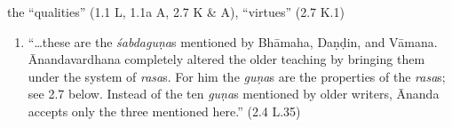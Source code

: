 \documentclass[10pt]{article}
\begin{document}
\begin{multicols}{2}
\begin{enumerate}[
			leftmargin=0em,
			rightmargin=0em,
		]



		 the ``qualities'' (1.1 L, 1.1a A, 2.7 K \& A), ``virtues'' (2.7 K.1)
		\begin{enumerate}
			 ``sweetness'' (2.7 K.1),

			 ``force'' (2.7 K.1),
			``strength'' (2.9 K)

			 ``clarity'' (2.7 K.1),
			``perspicuity'' [K. Kris.\ 2.10 K?, p.???],
			\textbf{NB}: ``[clarity] is a quality common to all \textit{rasa}s'' (2.10 A)

			\item ``\dots these are the \textit{śabdaguṇa}s mentioned by Bhāmaha, Daṇḍin, and Vāmana. Ānanda\-var\-dhana completely altered the older teaching by bringing them under the system of \textit{rasa}s. For him the \textit{guṇa}s are the properties of the \textit{rasa}s; see 2.7 below. Instead of the ten \textit{guṇa}s mentioned by older writers, Ānanda accepts only the three mentioned here.'' (2.4 L.35)
		\end{enumerate}



\end{enumerate}
\end{multicols}
\end{document}
